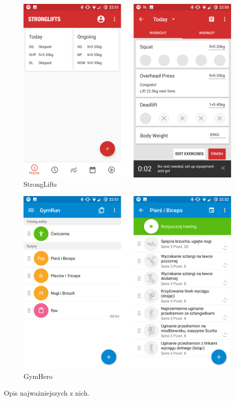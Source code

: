 \begin{figure}[H]
\centering
\includegraphics[width=\textwidth, keepaspectratio=true]{grafika/istn2.jpg} 
	\caption{ StrongLifts }
\end{figure}

\begin{figure}[H]
\centering
\includegraphics[width=\textwidth, keepaspectratio=true]{grafika/istn4.jpg} 
	\caption{ GymHero }
\end{figure}
\newpage

Opis najważniejszych z nich.

